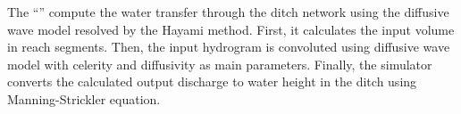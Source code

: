 The ``\englishname'' compute the water transfer through the ditch network 
using the diffusive wave model resolved by the Hayami method. First, it 
calculates the input volume in reach segments. Then, the input hydrogram is 
convoluted using diffusive wave model with celerity and diffusivity as main 
parameters. Finally, the simulator converts the calculated output discharge 
to water height in the ditch using Manning-Strickler equation.
